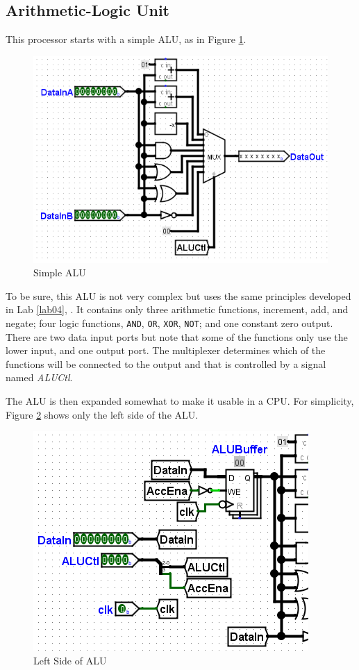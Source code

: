 \subsection{Arithmetic-Logic Unit}

This processor starts with a simple \ac{ALU}, as in Figure \ref{fig:11-01}.

\begin{figure}[H]
	\centering
	\includegraphics[width=\maxwidth{.95\linewidth}]{gfx/11-01}
	\caption{Simple ALU}
	\label{fig:11-01}
\end{figure}

To be sure, this \ac{ALU} is not very complex but uses the same principles developed in Lab \ref{lab04}, . It contains only three arithmetic functions, increment, add, and negate; four logic functions, \texttt{AND}, \texttt{OR}, \texttt{XOR}, \texttt{NOT}; and one constant zero output. There are two data input ports but note that some of the functions only use the lower input, and one output port. The multiplexer determines which of the functions will be connected to the output and that is controlled by a signal named \textit{ALUCtl}.

The \ac{ALU} is then expanded somewhat to make it usable in a \ac{CPU}. For simplicity, Figure \ref{fig:11-02} shows only the left side of the ALU.

\begin{figure}[H]
	\centering
	\includegraphics[width=\maxwidth{.95\linewidth}]{gfx/11-02}
	\caption{Left Side of ALU}
	\label{fig:11-02}
\end{figure}

